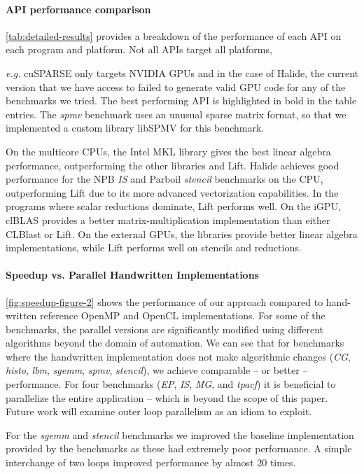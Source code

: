 \paragraph{API performance comparison}
\autoref{tab:detailed-results} provides a breakdown of the performance of each API on each program and platform.
Not all APIs
target all platforms, {\emph{e.g.} cuSPARSE only targets NVIDIA GPUs and in the
case of Halide, the current version that we have access to failed to generate
valid GPU code for any of the benchmarks we tried.
The best performing API is highlighted in bold in the table entries.
The \emph{spmv} benchmark uses an unusual sparse matrix format, so that we
implemented a custom library libSPMV for this benchmark.

On the multicore CPUs, the Intel MKL library gives the best linear algebra performance, outperforming the other libraries and Lift.
Halide achieves good performance for the NPB \emph{IS} and Parboil \emph{stencil} benchmarks on the CPU, outperforming Lift due to its more advanced vectorization capabilities.
In the programs where scalar reductions dominate, Lift performs well.
On the iGPU, clBLAS provides a better matrix-multiplication implementation than either CLBlast or Lift.
On the external GPUs, the libraries provide better linear algebra implementations, while Lift performs well on stencils and reductions.

\paragraph{Speedup vs. Parallel Handwritten Implementations}
\autoref{fig:speedup-figure-2} shows the performance of our approach compared to hand-written reference OpenMP and OpenCL implementations.
For some of the benchmarks, the parallel versions are significantly modified using different algorithms beyond the domain of automation.
We can see that for benchmarks where the handwritten implementation does not make algorithmic changes (\emph{CG}, \emph{histo}, \emph{lbm}, \emph{sgemm}, \emph{spmv}, \emph{stencil}), we achieve comparable -- or better -- performance.
For four benchmarks (\emph{EP}, \emph{IS}, \emph{MG}, and \emph{tpacf}) it is beneficial to parallelize the entire application -- which is beyond the scope of this paper. Future work will examine outer loop parallelism as an idiom to exploit.

For the \emph{sgemm} and \emph{stencil} benchmarks we improved the baseline implementation provided by the benchmarks as these had extremely poor performance.
A simple interchange of two loops improved performance by almost 20 times.

}
